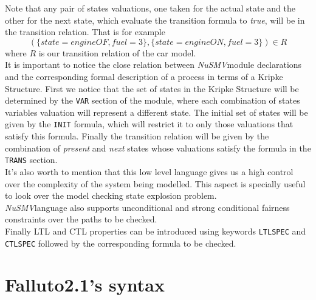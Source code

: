 \documentclass[12pt]{llncs2e/llncs}
\newcommand{\nusmv}{\mbox{\textit{NuSMV}}}
\begin{document}
Note that any pair of states valuations, one taken for the actual state and the
other for the next state, which evaluate the transition formula to \textit{true},
will be in the transition relation. That is for example
$$(\{state=engineOF, fuel=3\},\{state=engineON,fuel=3\}) \in R$$ where $R$ is our
transition relation of the car model.\\
It is important to notice the close relation between \nusmv module declarations and the corresponding formal description of a process in terms of a Kripke Structure. First we notice that the set of states in the Kripke Structure will be determined by the \texttt{VAR} section of the module, where each combination of states variables valuation will represent a different state. The initial set of states will be given by the \texttt{INIT} formula, which will restrict it to only those valuations that satisfy this formula. Finally the transition relation will be given by the combination of \textit{present} and \textit{next} states whose valuations satisfy the formula in the \texttt{TRANS} section.\\
It's also worth to mention that this low level language gives us a high control over the complexity of the system being modelled. This aspect is specially useful to look over the model checking state explosion problem.\\
\nusmv language also supports unconditional and strong conditional fairness constraints over the paths to be checked.\\
Finally LTL and CTL properties can be introduced using keywords \texttt{LTLSPEC} and \texttt{CTLSPEC} followed by the corresponding formula to be checked.



\section{Falluto2.1's syntax}
\end{document}
